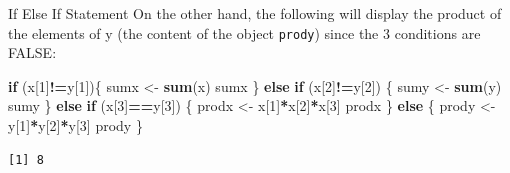 \documentclass[
  ignorenonframetext,
]{beamer}
\newenvironment{Shaded}{\begin{snugshade}}{\end{snugshade}}
\newcommand{\ControlFlowTok}[1]{\textcolor[rgb]{0.13,0.29,0.53}{\textbf{#1}}}
\newcommand{\DecValTok}[1]{\textcolor[rgb]{0.00,0.00,0.81}{#1}}
\newcommand{\FunctionTok}[1]{\textcolor[rgb]{0.13,0.29,0.53}{\textbf{#1}}}
\newcommand{\NormalTok}[1]{#1}
\newcommand{\OtherTok}[1]{\textcolor[rgb]{0.56,0.35,0.01}{#1}}
\newcommand{\SpecialCharTok}[1]{\textcolor[rgb]{0.81,0.36,0.00}{\textbf{#1}}}
\begin{document}
\begin{frame}[fragile]{If Else If Statement}
\label{if-else-if-statement-2}
On the other hand, the following will display the product of the
elements of y (the content of the object \texttt{prody}) since the 3
conditions are FALSE:

\small

\begin{Shaded}
\begin{Highlighting}[]
\ControlFlowTok{if}\NormalTok{ (x[}\DecValTok{1}\NormalTok{]}\SpecialCharTok{!=}\NormalTok{y[}\DecValTok{1}\NormalTok{])\{}
\NormalTok{  sumx }\OtherTok{\textless{}{-}} \FunctionTok{sum}\NormalTok{(x)}
\NormalTok{  sumx}
\NormalTok{    \} }\ControlFlowTok{else} \ControlFlowTok{if}\NormalTok{ (x[}\DecValTok{2}\NormalTok{]}\SpecialCharTok{!=}\NormalTok{y[}\DecValTok{2}\NormalTok{]) \{}
\NormalTok{  sumy }\OtherTok{\textless{}{-}} \FunctionTok{sum}\NormalTok{(y)}
\NormalTok{  sumy}
\NormalTok{   \} }\ControlFlowTok{else} \ControlFlowTok{if}\NormalTok{ (x[}\DecValTok{3}\NormalTok{]}\SpecialCharTok{==}\NormalTok{y[}\DecValTok{3}\NormalTok{]) \{}
\NormalTok{     prodx }\OtherTok{\textless{}{-}}\NormalTok{ x[}\DecValTok{1}\NormalTok{]}\SpecialCharTok{*}\NormalTok{x[}\DecValTok{2}\NormalTok{]}\SpecialCharTok{*}\NormalTok{x[}\DecValTok{3}\NormalTok{]}
\NormalTok{     prodx}
\NormalTok{   \} }\ControlFlowTok{else}\NormalTok{ \{}
\NormalTok{   prody }\OtherTok{\textless{}{-}}\NormalTok{ y[}\DecValTok{1}\NormalTok{]}\SpecialCharTok{*}\NormalTok{y[}\DecValTok{2}\NormalTok{]}\SpecialCharTok{*}\NormalTok{y[}\DecValTok{3}\NormalTok{]}
\NormalTok{   prody}
\NormalTok{\}}
\end{Highlighting}
\end{Shaded}

\begin{verbatim}
[1] 8
\end{verbatim}

\normalsize
\end{frame}
\end{document}
